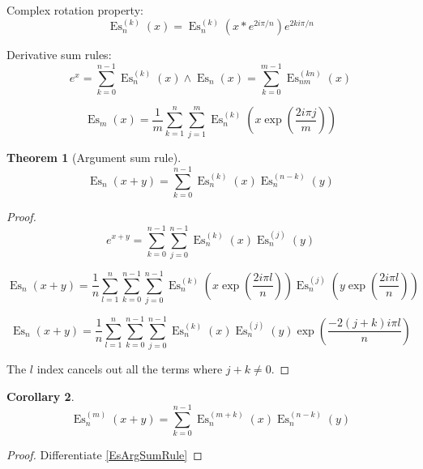 \documentclass[]{article}
\DeclareMathOperator{\es}{Es}
\newcommand{\pqty}[1]{{\left(#1\right)}}
\newtheorem{theorem}{Theorem}[section]
\newtheorem{corollary}[theorem]{Corollary}
\numberwithin{equation}{section}
\begin{document}
	Complex rotation property:
	\begin{equation}
	\es_n^{(k)}\pqty{x}=
	\es_n^{(k)}\pqty{x*e^{2i\pi/n}}e^{2ki\pi/n}
	\end{equation}
	
	Derivative sum rules:
	\begin{equation}
	e^x=\sum_{k=0}^{n-1}\es_n^{(k)}\pqty{x}\land\es_n\pqty{x}=\sum_{k=0}^{m-1}\es_{nm}^{(kn)}\pqty{x}
	\end{equation}
	
	\begin{equation}
	\es_m\pqty{x}=
	\frac{1}{m}
	\sum_{k=1}^{n}\sum_{j=1}^{m}\es_n^{(k)}\pqty{x\exp\pqty{\frac{2 i \pi j}{m}}}
	\end{equation}
	
	\begin{theorem}[Argument sum rule]
		\begin{equation}
		\label{EsArgSumRule}
		\es_n\pqty{x+y}=
		\sum_{k=0}^{n-1}
		\es_n^{(k)}\pqty{x}
		\es_n^{(n-k)}\pqty{y}
		\end{equation}
	\end{theorem}
	\begin{proof}
		\begin{equation}
		e^{x+y}=\sum_{k=0}^{n-1}\sum_{j=0}^{n-1}\es_n^{(k)}\pqty{x}\es_n^{(j)}\pqty{y}
		\end{equation}
		
		\begin{equation}
		\es_n\pqty{x+y}=
		\frac{1}{n}\sum _{l=1}^n \sum_{k=0}^{n-1}\sum_{j=0}^{n-1}
		\es_n^{(k)}\pqty{x\exp\pqty{\frac{2 i \pi  l}{n}}}
		\es_n^{(j)}\pqty{y\exp\pqty{\frac{2 i \pi  l}{n}}}
		\end{equation}
		
		\begin{equation}
		\es_n\pqty{x+y}=
		\frac{1}{n}\sum _{l=1}^n \sum_{k=0}^{n-1}\sum_{j=0}^{n-1}
		\es_n^{(k)}\pqty{x}
		\es_n^{(j)}\pqty{y}
		\exp\pqty{\frac{-2(j+k) i \pi  l}{n}}
		\end{equation}
		
		The \(l\) index cancels out all the terms where \(j+k\neq 0\).
	\end{proof}

	\begin{corollary}
		\begin{equation}
			\label{EsmArgSumRule}
			\es_n^{(m)}\pqty{x+y}=
			\sum_{k=0}^{n-1}
			\es_n^{(m+k)}\pqty{x}
			\es_n^{(n-k)}\pqty{y}
		\end{equation}
	\end{corollary}
	\begin{proof}
		Differentiate \eqref{EsArgSumRule}
	\end{proof}
\end{document}
